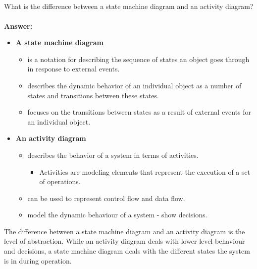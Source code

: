 \documentclass[a4paper]{article}
\begin{document}
\subsection{}
What is the difference between a state machine diagram and an activity diagram?\\
\\
\textbf{Answer:} 
\begin{itemize}
\item \textbf{A state machine diagram}
\begin{itemize}
\item is a notation for describing the sequence of states an object goes through in response to external events.
\item describes the dynamic behavior of an individual object as a number of states and transitions between these states.
\item focuses on the transitions between states as a result of external events for an individual object.
\end{itemize}
\item \textbf{An activity diagram}
\begin{itemize}
\item describes the behavior of a system in terms of activities.
\begin{itemize}
\item Activities are modeling elements that represent the execution of a set of operations. 
\end{itemize}
\item can be used to represent control flow and data flow.
\item model the dynamic behaviour of a system - show decisions.
\end{itemize}
\end{itemize}
The difference between a state machine diagram and an activity diagram is the level of abstraction. While an activity diagram deals with lower level behaviour and decisions, a state machine diagram deals with the different states the system is in during operation.
\end{document}
